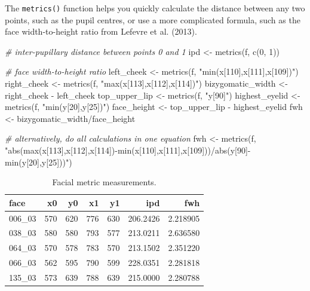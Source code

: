 \documentclass[
  doc,floatsintext]{apa6}
\newenvironment{Shaded}{\begin{snugshade}}{\end{snugshade}}
\newcommand{\CommentTok}[1]{\textcolor[rgb]{0.56,0.35,0.01}{\textit{#1}}}
\newcommand{\DecValTok}[1]{\textcolor[rgb]{0.00,0.00,0.81}{#1}}
\newcommand{\FunctionTok}[1]{\textcolor[rgb]{0.00,0.00,0.00}{#1}}
\newcommand{\NormalTok}[1]{#1}
\newcommand{\OtherTok}[1]{\textcolor[rgb]{0.56,0.35,0.01}{#1}}
\newcommand{\SpecialCharTok}[1]{\textcolor[rgb]{0.00,0.00,0.00}{#1}}
\newcommand{\StringTok}[1]{\textcolor[rgb]{0.31,0.60,0.02}{#1}}
\begin{document}
The \texttt{metrics()} function helps you quickly calculate the distance between any two points, such as the pupil centres, or use a more complicated formula, such as the face width-to-height ratio from Lefevre et al. (2013).

\begin{Shaded}
\begin{Highlighting}[]
\CommentTok{\# inter{-}pupillary distance between points 0 and 1}
\NormalTok{ipd }\OtherTok{\textless{}{-}} \FunctionTok{metrics}\NormalTok{(f, }\FunctionTok{c}\NormalTok{(}\DecValTok{0}\NormalTok{, }\DecValTok{1}\NormalTok{))}

\CommentTok{\# face width{-}to{-}height ratio}
\NormalTok{left\_cheek }\OtherTok{\textless{}{-}} \FunctionTok{metrics}\NormalTok{(f, }\StringTok{"min(x[110],x[111],x[109])"}\NormalTok{)}
\NormalTok{right\_cheek }\OtherTok{\textless{}{-}} \FunctionTok{metrics}\NormalTok{(f, }\StringTok{"max(x[113],x[112],x[114])"}\NormalTok{)}
\NormalTok{bizygomatic\_width }\OtherTok{\textless{}{-}}\NormalTok{ right\_cheek }\SpecialCharTok{{-}}\NormalTok{ left\_cheek}
\NormalTok{top\_upper\_lip }\OtherTok{\textless{}{-}} \FunctionTok{metrics}\NormalTok{(f, }\StringTok{"y[90]"}\NormalTok{)}
\NormalTok{highest\_eyelid }\OtherTok{\textless{}{-}} \FunctionTok{metrics}\NormalTok{(f, }\StringTok{"min(y[20],y[25])"}\NormalTok{)}
\NormalTok{face\_height }\OtherTok{\textless{}{-}}\NormalTok{ top\_upper\_lip }\SpecialCharTok{{-}}\NormalTok{ highest\_eyelid}
\NormalTok{fwh }\OtherTok{\textless{}{-}}\NormalTok{ bizygomatic\_width}\SpecialCharTok{/}\NormalTok{face\_height}

\CommentTok{\# alternatively, do all calculations in one equation}
\NormalTok{fwh }\OtherTok{\textless{}{-}} \FunctionTok{metrics}\NormalTok{(f, }\StringTok{"abs(max(x[113],x[112],x[114]){-}min(x[110],x[111],x[109]))/abs(y[90]{-}min(y[20],y[25]))"}\NormalTok{)}
\end{Highlighting}
\end{Shaded}

\begin{table}

\caption{\label{tab:metrics}Facial metric measurements.}
\centering
\begin{tabular}[t]{l|r|r|r|r|r|r}
\hline
face & x0 & y0 & x1 & y1 & ipd & fwh\\
\hline
006\_03 & 570 & 620 & 776 & 630 & 206.2426 & 2.218905\\
\hline
038\_03 & 580 & 580 & 793 & 577 & 213.0211 & 2.636580\\
\hline
064\_03 & 570 & 578 & 783 & 570 & 213.1502 & 2.351220\\
\hline
066\_03 & 562 & 595 & 790 & 599 & 228.0351 & 2.281818\\
\hline
135\_03 & 573 & 639 & 788 & 639 & 215.0000 & 2.280788\\
\hline
\end{tabular}
\end{table}
\end{document}
